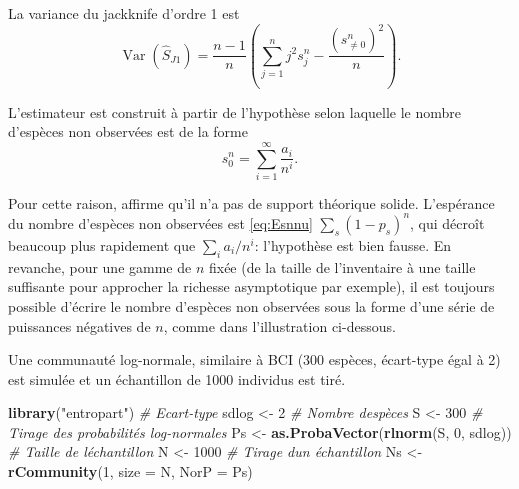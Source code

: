 \documentclass[
  11pt,
  french,
  a4paper,
  extrafontsizes,onecolumn,openright
  ]{memoir}
\newenvironment{Shaded}{\begin{snugshade}}{\end{snugshade}}
\newcommand{\AttributeTok}[1]{\textcolor[rgb]{0.13,0.29,0.53}{#1}}
\newcommand{\CommentTok}[1]{\textcolor[rgb]{0.56,0.35,0.01}{\textit{#1}}}
\newcommand{\DecValTok}[1]{\textcolor[rgb]{0.00,0.00,0.81}{#1}}
\newcommand{\FunctionTok}[1]{\textcolor[rgb]{0.13,0.29,0.53}{\textbf{#1}}}
\newcommand{\NormalTok}[1]{#1}
\newcommand{\OtherTok}[1]{\textcolor[rgb]{0.56,0.35,0.01}{#1}}
\newcommand{\StringTok}[1]{\textcolor[rgb]{0.31,0.60,0.02}{#1}}
\begin{document}
La variance du jackknife d'ordre 1 est \autocite{Heltshe1983}
\begin{equation} 
  \label{eq:VarJack1}
  \operatorname{Var}{\left( \hat{S}_\mathit{J1} \right)}
  = \frac{n-1}{n} \left( \sum_{j=1}^{n}{j^2 s^{n}_{j}} - \frac{\left( s^{n}_{\ne 0} \right)^2}{n} \right).
\end{equation}

L'estimateur est construit à partir de l'hypothèse selon laquelle le nombre d'espèces non observées est de la forme
\[s^{n}_{0} = \sum_{i=1}^{\infty}{\frac{a_i}{n^i}}.\]

Pour cette raison, \textcite{Cormack1989} affirme qu'il n'a pas de support théorique solide.
L'espérance du nombre d'espèces non observées est \eqref{eq:Esnnu} \(\sum_s{(1-p_s)^n}\), qui décroît beaucoup plus rapidement que \(\sum_{i}{{a_i}/{n^i}}\): l'hypothèse est bien fausse.
En revanche, pour une gamme de \(n\) fixée (de la taille de l'inventaire à une taille suffisante pour approcher la richesse asymptotique par exemple), il est toujours possible d'écrire le nombre d'espèces non observées sous la forme d'une série de puissances négatives de \(n\), comme dans l'illustration ci-dessous.

Une communauté log-normale, similaire à BCI (300 espèces, écart-type égal à 2) est simulée et un échantillon de 1000 individus est tiré.

\scriptsize

\begin{Shaded}
\begin{Highlighting}[]
\FunctionTok{library}\NormalTok{(}\StringTok{"entropart"}\NormalTok{)}
\CommentTok{\# Ecart{-}type}
\NormalTok{sdlog }\OtherTok{\textless{}{-}} \DecValTok{2}
\CommentTok{\# Nombre d\textquotesingle{}espèces}
\NormalTok{S }\OtherTok{\textless{}{-}} \DecValTok{300}
\CommentTok{\# Tirage des probabilités log{-}normales}
\NormalTok{Ps }\OtherTok{\textless{}{-}} \FunctionTok{as.ProbaVector}\NormalTok{(}\FunctionTok{rlnorm}\NormalTok{(S, }\DecValTok{0}\NormalTok{, sdlog))}
\CommentTok{\# Taille de l\textquotesingle{}échantillon}
\NormalTok{N }\OtherTok{\textless{}{-}} \DecValTok{1000}
\CommentTok{\# Tirage d\textquotesingle{}un échantillon}
\NormalTok{Ns }\OtherTok{\textless{}{-}} \FunctionTok{rCommunity}\NormalTok{(}\DecValTok{1}\NormalTok{, }\AttributeTok{size =}\NormalTok{ N, }\AttributeTok{NorP =}\NormalTok{ Ps)}
\end{Highlighting}
\end{Shaded}

\normalsize
\end{document}
